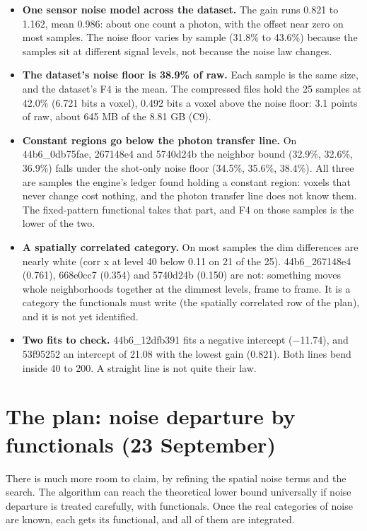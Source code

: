 \begin{itemize}
\item \textbf{One sensor noise model across the dataset.} The gain runs 0.821 to 1.162, mean 0.986: about one count a photon, with the offset near zero on most samples. The noise floor varies by sample (31.8\% to 43.6\%) because the samples sit at different signal levels, not because the noise law changes.
\item \textbf{The dataset's noise floor is 38.9\% of raw.} Each sample is the same size, and the dataset's F4 is the mean. The compressed files hold the 25 samples at 42.0\% (6.721 bits a voxel), 0.492 bits a voxel above the noise floor: 3.1 points of raw, about 645 MB of the 8.81 GB (C9).
\item \textbf{Constant regions go below the photon transfer line.} On 44b6\_\allowbreak{}0db75fae, 267148e4 and 5740d24b the neighbor bound (32.9\%, 32.6\%, 36.9\%) falls under the shot-only noise floor (34.5\%, 35.6\%, 38.4\%). All three are samples the engine's ledger found holding a constant region: voxels that never change cost nothing, and the photon transfer line does not know them. The fixed-pattern functional takes that part, and F4 on those samples is the lower of the two.
\item \textbf{A spatially correlated category.} On most samples the dim differences are nearly white (corr x at level 40 below 0.11 on 21 of the 25). 44b6\_\allowbreak{}267148e4 (0.761), 668e0cc7 (0.354) and 5740d24b (0.150) are not: something moves whole neighborhoods together at the dimmest levels, frame to frame. It is a category the functionals must write (the spatially correlated row of the plan), and it is not yet identified.
\item \textbf{Two fits to check.} 44b6\_\allowbreak{}12dfb391 fits a negative intercept (−11.74), and 53f95252 an intercept of 21.08 with the lowest gain (0.821). Both lines bend inside 40 to 200. A straight line is not quite their law.
\end{itemize}

\section{\texorpdfstring{The plan: noise departure by functionals (23 September)}{The plan: noise departure by functionals (23 September)}}

There is much more room to claim, by refining the spatial noise terms and the search. The algorithm can reach the theoretical lower bound universally if noise departure is treated carefully, with functionals. Once the real categories of noise are known, each gets its functional, and all of them are integrated.

